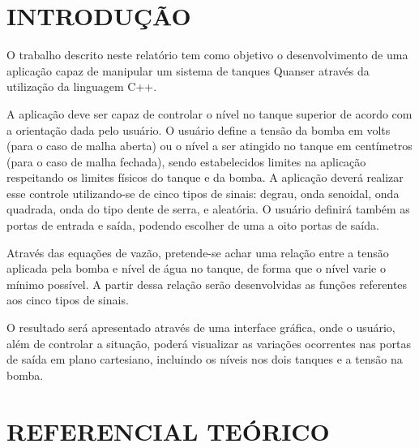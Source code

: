 \documentclass[a4paper,12pt]{article}
\begin{document}
\newpage


\thispagestyle{main}

\section{INTRODUÇÃO}

\begin{flushleft}
\hspace{4ex}O trabalho descrito neste relatório tem como objetivo o desenvolvimento de uma aplicação capaz de manipular um sistema de tanques Quanser através da utilização da linguagem C++.

A aplicação deve ser capaz de controlar o nível no tanque superior de acordo com a orientação dada pelo usuário. O usuário define a tensão da bomba em volts (para o caso de malha aberta) ou o nível a ser atingido no tanque em centímetros (para o caso de malha fechada), sendo estabelecidos limites na aplicação respeitando os limites físicos do tanque e da bomba. A aplicação deverá realizar esse controle utilizando-se de cinco tipos de sinais: degrau, onda senoidal, onda quadrada, onda do tipo dente de serra, e aleatória. O usuário definirá também as portas de entrada e saída, podendo escolher de uma a oito portas de saída.

Através das equações de vazão, pretende-se achar uma relação entre a tensão aplicada pela bomba e nível de água no tanque, de forma que o nível varie o mínimo possível. A partir dessa relação serão desenvolvidas as funções referentes aos cinco tipos de sinais.

O resultado será apresentado através de uma interface gráfica, onde o usuário, além de controlar a situação, poderá visualizar as variações ocorrentes nas portas de saída em plano cartesiano, incluindo os níveis nos dois tanques e a tensão na bomba.
\end{flushleft}

\newpage


\thispagestyle{main}

\section{REFERENCIAL TEÓRICO}
\end{document}
